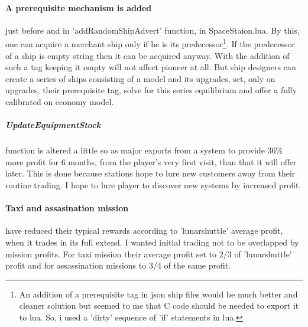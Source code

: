 \documentclass[]{article}
\begin{document}
\paragraph{A prerequisite mechanism is added} just before and in 'addRandomShipAdvert' function, in SpaceStaion.lua. By this, one can acquire a merchant ship only if he is its predecessor\footnote{An addition of a prerequisite tag in json ship files would be much better and cleaner solution but seemed to me that C code should be needed to export it to lua. So, i used a 'dirty' sequence of \textsf{'if'} statements in lua.}. If the predecessor of a ship is empty string then it can be acquired anyway. With the addition of such a tag keeping it empty will not affect pioneer at all. But ship designers can create a series of ships consisting of a model and its upgrades, set, only on upgrades, their prerequisite tag, solve for this series equilibrium and offer a fully calibrated on economy model.
\subparagraph{UpdateEquipmentStock} function is altered a little so as major exports from a system to provide 36\% more profit for 6 months, from the player's very first visit, than that it will offer later. This is done because stations hope to lure new customers away from their routine trading. I hope to lure player to discover new systems by increased profit.
\paragraph{Taxi and assasination mission} have reduced their typical rewards according to 'lunarshuttle' average profit, when it trades in its full extend. I wanted initial trading not to be overlapped by mission profits. For taxi mission their average profit set to 2/3 of 'lunarshuttle' profit and for assassination missions to 3/4 of the same profit.
\end{document}
